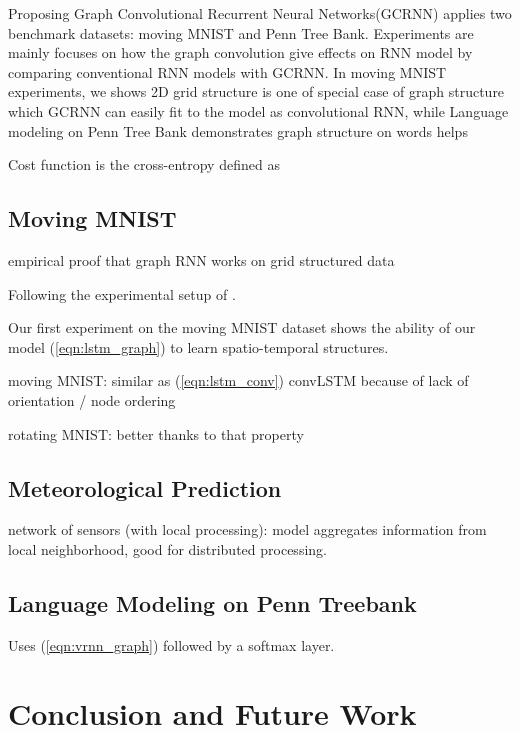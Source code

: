 \documentclass{article} %
\newcommand{\eqnref}[1]{(\ref{eqn:#1})}
\newcommand{\todo}[1]{{\color{red} #1 }}
\begin{document}
\newpage

Proposing Graph Convolutional Recurrent Neural Networks(GCRNN) applies two benchmark datasets: moving MNIST\citet{moving_mnist} and Penn Tree Bank\citet{ptb}. Experiments are mainly focuses on how the graph convolution give effects on RNN model by comparing conventional RNN models with GCRNN. In moving MNIST experiments, we shows 2D grid structure is one of special case of graph structure which GCRNN can easily fit to the model as convolutional RNN, while Language modeling on Penn Tree Bank demonstrates graph structure on words helps 

Cost function is the cross-entropy defined as

\subsection{Moving MNIST}
\todo{empirical proof that graph RNN works on grid structured data}


Following the experimental setup of \citet{convlstm}.

Our first experiment on the moving MNIST dataset \citet{moving_mnist} shows the
ability of our model \eqnref{lstm_graph} to learn spatio-temporal structures.

moving MNIST: similar as \eqnref{lstm_conv} convLSTM because of lack of orientation / node ordering

rotating MNIST: better thanks to that property

\subsection{Meteorological Prediction}

network of sensors (with local processing):
model aggregates information from local neighborhood, good for distributed processing.

\subsection{Language Modeling on Penn Treebank}

Uses \eqnref{vrnn_graph} followed by a softmax layer.

\section{Conclusion and Future Work}
\end{document}
